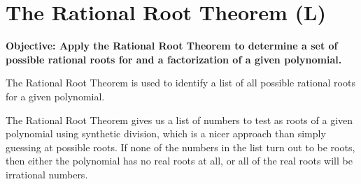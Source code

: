 \documentclass[12pt]{book}
\theoremstyle{definition}
\begin{document}
\section{The Rational Root Theorem (L)}
{\bf Objective: Apply the Rational Root Theorem to determine a set of possible rational roots for and a factorization of a given polynomial.}\par
The Rational Root Theorem is used to identify a list of all possible rational roots for a given polynomial.
\begin{center}
\end{center}
The Rational Root Theorem gives us a list of numbers to test as roots of a given polynomial using synthetic division, which is a nicer approach than simply guessing at possible roots.  If none of the numbers in the list turn out to be roots, then either the polynomial has no real roots at all, or all of the real roots will be irrational numbers.\par
\end{document}
